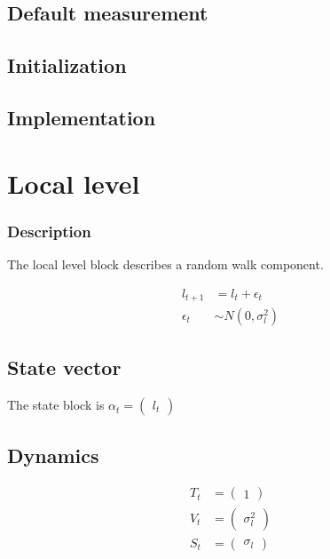 \documentclass[
  letterpaper,
  DIV=11,
  numbers=noendperiod]{scrreprt}
\begin{document}
\subsection{Default measurement}\label{default-measurement-3}

\subsection{Initialization}\label{initialization-4}

\subsection{Implementation}\label{implementation}

\section{Local level}\label{local-level}

\subsubsection{Description}\label{description}

The local level block describes a random walk component.

\[
\begin{align*}
l_{t+1} &= l_t + \epsilon_t \\
\epsilon_t &\sim N(0, \sigma^2_l)
\end{align*}
\]

\subsection{State vector}\label{state-vector-4}

The state block is \(\alpha_t=\begin{pmatrix} l_t  \end{pmatrix}\)

\subsection{Dynamics}\label{dynamics-4}

\[
\begin{align*}
T_t &= \begin{pmatrix} 1 \end{pmatrix} \\
V_t &= \begin{pmatrix}\sigma^2_l \end{pmatrix}\\
S_t &= \begin{pmatrix}\sigma_l \end{pmatrix}
\end{align*}
\]
\end{document}
